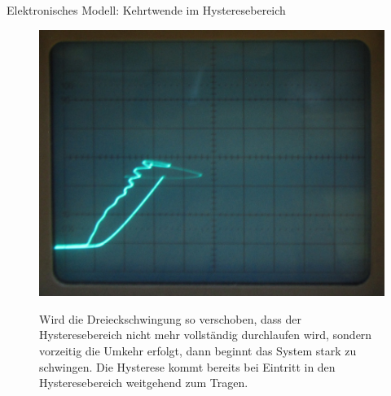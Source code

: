 \documentclass{beamer}
\begin{document}
\begin{frame}{Elektronisches Modell: Kehrtwende im Hysteresebereich}
  \begin{figure}
    \centering
    \label{fig:aborted_hysteresis}
    {\includegraphics[width=0.5\paperwidth,center]
      {../images/aborted-hysteresis.jpg}}
    \caption{Wird die Dreieckschwingung so verschoben, dass der
      Hysteresebereich nicht mehr vollständig durchlaufen wird,
      sondern vorzeitig die Umkehr erfolgt, dann beginnt das System
      stark zu schwingen.  Die Hysterese kommt bereits bei Eintritt in
      den Hysteresebereich weitgehend zum Tragen.}
  \end{figure}
\end{frame}

\end{document}
